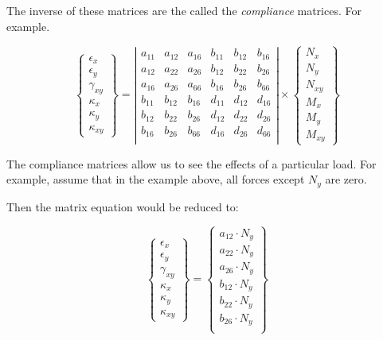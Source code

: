 \documentclass[a4paper,landscape,oneside,11pt,twocolumn]{memoir}
\begin{document}
The inverse of these matrices are the called the \emph{compliance} matrices.
For example.

\[
  \left\{\begin{array}{c}
      \epsilon_x\\[2pt] \epsilon_y\\[2pt] \gamma_{xy}\\[2pt]
      \kappa_x\\[2pt] \kappa_y\\[2pt] \kappa_{xy}
    \end{array}\right\} = 
    \left|\begin{array}{cccccc}
        a_{11} & a_{12} & a_{16} & b_{11} & b_{12} & b_{16}\\
        a_{12} & a_{22} & a_{26} & b_{12} & b_{22} & b_{26}\\
        a_{16} & a_{26} & a_{66} & b_{16} & b_{26} & b_{66}\\
        b_{11} & b_{12} & b_{16} & d_{11} & d_{12} & d_{16}\\
        b_{12} & b_{22} & b_{26} & d_{12} & d_{22} & d_{26}\\
        b_{16} & b_{26} & b_{66} & d_{16} & d_{26} & d_{66}\\
    \end{array}\right|
    \times
      \left\{\begin{array}{c}
              N_x\\ N_y\\ N_{xy}\\ M_x\\ M_y\\ M_{xy}
            \end{array}\right\}
\]

The compliance matrices allow us to see the effects of a particular load.
For example, assume that in the example above, all forces except $N_y$ are
zero.

Then the matrix equation would be reduced to:

\[
  \left\{\begin{array}{c}
      \epsilon_x\\[2pt] \epsilon_y\\[2pt] \gamma_{xy}\\[2pt]
      \kappa_x\\[2pt] \kappa_y\\[2pt] \kappa_{xy}
    \end{array}\right\} = 
     \left\{\begin{array}{c}
              a_{12}\cdot N_y \\
              a_{22}\cdot N_y \\
              a_{26}\cdot N_y \\
              b_{12}\cdot N_y \\
              b_{22}\cdot N_y \\
              b_{26}\cdot N_y \\
            \end{array}\right\}
\]
\end{document}
